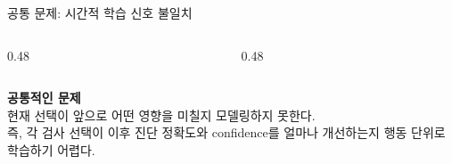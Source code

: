 \documentclass[
11pt,notheorems,hyperref={pdfauthor=whatever}
]{beamer}
\begin{document}
\begin{frame}{공통 문제: 시간적 학습 신호 불일치}
\vspace{0.2em}
\begin{columns}[T,onlytextwidth]
\begin{column}{0.48\textwidth}
\begin{center}
\end{center}
\end{column}
\begin{column}{0.48\textwidth}
\begin{center}
\end{center}
\end{column}
\end{columns}

\begin{center}
\vspace{0.85em}
{\large\bfseries\textcolor{DeepBlue}{공통적인 문제}}\\[0.65em]
\small
현재 선택이 앞으로 어떤 영향을 미칠지 모델링하지 못한다.\\
즉, 각 검사 선택이 이후 진단 정확도와 confidence를 얼마나 개선하는지
행동 단위로 학습하기 어렵다.
\end{center}
\end{frame}
\end{document}
